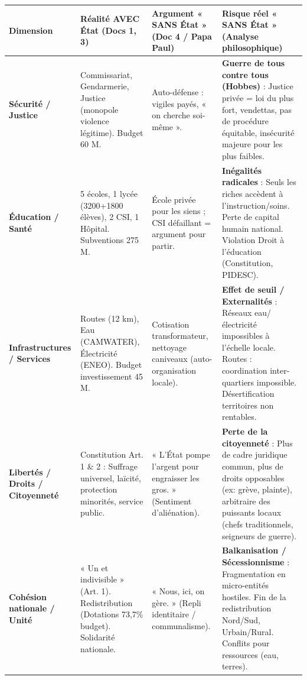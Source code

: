 \documentclass[11pt]{article}
\newcommand{\cle}[1]{{\popxbold\color{popdark}#1}}
\begin{document}
\begin{exoresolu}
\begin{center}
\begin{tabularx}{\linewidth}{|l|X|X|X|}\hline
\rowcolor{popblueL}
\textbf{Dimension} & \textbf{Réalité AVEC État (Docs 1, 3)} & \textbf{Argument « SANS État » (Doc 4 / Papa Paul)} & \textbf{Risque réel « SANS État » (Analyse philosophique)} \\ \hline
\textbf{Sécurité / Justice} & Commissariat, Gendarmerie, Justice (monopole violence légitime). Budget 60 M. & Auto-défense : vigiles payés, « on cherche soi-même ». & \textbf{Guerre de tous contre tous (Hobbes)} : Justice privée = loi du plus fort, vendettas, pas de procédure équitable, insécurité majeure pour les plus faibles. \\ \hline
\textbf{Éducation / Santé} & 5 écoles, 1 lycée (3200+1800 élèves), 2 CSI, 1 Hôpital. Subventions 275 M. & École privée pour les siens ; CSI défaillant = argument pour partir. & \textbf{Inégalités radicales} : Seuls les riches accèdent à l'instruction/soins. Perte de \cle{capital humain} national. Violation Droit à l'éducation (Constitution, PIDESC). \\ \hline
\textbf{Infrastructures / Services} & Routes (12 km), Eau (CAMWATER), Électricité (ENEO). Budget investissement 45 M. & Cotisation transformateur, nettoyage caniveaux (auto-organisation locale). & \textbf{Effet de seuil / Externalités} : Réseaux eau/électricité impossibles à l'échelle locale. Routes : coordination inter-quartiers impossible. Désertification territoires non rentables. \\ \hline
\textbf{Libertés / Droits / Citoyenneté} & Constitution Art. 1 \& 2 : Suffrage universel, laïcité, protection minorités, service public. & « L'État pompe l'argent pour engraisser les gros. » (Sentiment d'aliénation). & \textbf{Perte de la citoyenneté} : Plus de cadre juridique commun, plus de droits opposables (ex: grève, plainte), arbitraire des puissants locaux (chefs traditionnels, seigneurs de guerre). \\ \hline
\textbf{Cohésion nationale / Unité} & « Un et indivisible » (Art. 1). Redistribution (Dotations 73,7\% budget). Solidarité nationale. & « Nous, ici, on gère. » (Repli identitaire / communalisme). & \textbf{Balkanisation / Sécessionnisme} : Fragmentation en micro-entités hostiles. Fin de la redistribution Nord/Sud, Urbain/Rural. Conflits pour ressources (eau, terres). \\ \hline
\end{tabularx}
\end{center}


\end{exoresolu}
\end{document}
